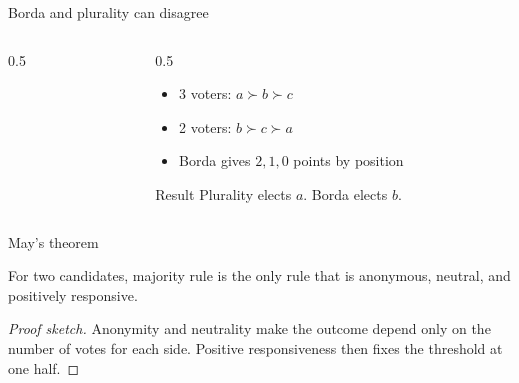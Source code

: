 \documentclass[aspectratio=169]{beamer}
\begin{document}
\begin{frame}{Borda and plurality can disagree}
  \begin{columns}
    \begin{column}{0.5\textwidth}
      \centering
    \end{column}
    \begin{column}{0.5\textwidth}
      \begin{itemize}
        \item 3 voters: $a \succ b \succ c$
        \item 2 voters: $b \succ c \succ a$
        \item Borda gives $2,1,0$ points by position
      \end{itemize}
      \begin{exampleblock}{Result}
        Plurality elects $a$. Borda elects $b$.
      \end{exampleblock}
    \end{column}
  \end{columns}
\end{frame}

\begin{frame}{May's theorem}
  \begin{theorem}[May, 1952]
    For two candidates, majority rule is the only rule that is anonymous, neutral, and positively responsive.
  \end{theorem}
  \begin{proof}[Proof sketch]
    Anonymity and neutrality make the outcome depend only on the number of votes for each side. Positive responsiveness then fixes the threshold at one half.
  \end{proof}
\end{frame}
\end{document}
